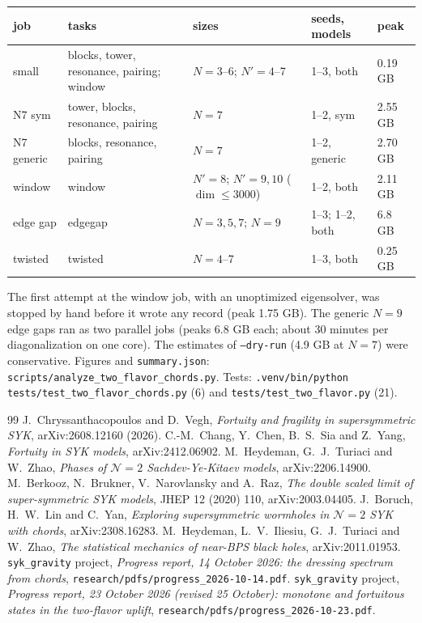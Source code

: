 \documentclass[11pt]{article}
\newcommand{\Np}{N'}
\theoremstyle{plain}
\theoremstyle{remark}
\numberwithin{equation}{section}
\begin{document}
\begin{center}\footnotesize
\begin{tabular}{lp{4.6cm}lll}
\toprule
job & tasks & sizes & seeds, models & peak\\
\midrule
small & blocks, tower, resonance, pairing; window & $N=3$--6; $\Np=4$--7 & 1--3, both & 0.19 GB\\
N7 sym & tower, blocks, resonance, pairing & $N=7$ & 1--2, sym & 2.55 GB\\
N7 generic & blocks, resonance, pairing & $N=7$ & 1--2, generic & 2.70 GB\\
window & window & $\Np=8$; $\Np=9,10$ ($\dim\le3000$) & 1--2, both & 2.11 GB\\
edge gap & edgegap & $N=3,5,7$; $N=9$ & 1--3; 1--2, both & 6.8 GB\\
twisted & twisted & $N=4$--7 & 1--3, both & 0.25 GB\\
\bottomrule
\end{tabular}
\end{center}
The first attempt at the window job, with an unoptimized eigensolver, was stopped by hand before it wrote any
record (peak 1.75 GB). The generic $N=9$ edge gaps ran as two parallel jobs (peaks 6.8 GB each; about 30 minutes per
diagonalization on one core). The estimates of \texttt{--dry-run} (4.9 GB at $N=7$) were conservative. Figures and
\texttt{summary.json}: \texttt{scripts/analyze\_two\_flavor\_chords.py}. Tests:
\texttt{.venv/bin/python tests/test\_two\_flavor\_chords.py} (6) and \texttt{tests/test\_two\_flavor.py} (21).

\begin{thebibliography}{99}\small
{} J.~Chryssanthacopoulos and D.~Vegh, \emph{Fortuity and fragility in supersymmetric SYK}, arXiv:2608.12160 (2026).
 C.-M.~Chang, Y.~Chen, B.~S.~Sia and Z.~Yang, \emph{Fortuity in SYK models}, arXiv:2412.06902.
 M.~Heydeman, G.~J.~Turiaci and W.~Zhao, \emph{Phases of $\mathcal N=2$ Sachdev-Ye-Kitaev models}, arXiv:2206.14900.
 M.~Berkooz, N.~Brukner, V.~Narovlansky and A.~Raz, \emph{The double scaled limit of super-symmetric SYK models}, JHEP 12 (2020) 110, arXiv:2003.04405.
 J.~Boruch, H.~W.~Lin and C.~Yan, \emph{Exploring supersymmetric wormholes in $\mathcal N=2$ SYK with chords}, arXiv:2308.16283.
 M.~Heydeman, L.~V.~Iliesiu, G.~J.~Turiaci and W.~Zhao, \emph{The statistical mechanics of near-BPS black holes}, arXiv:2011.01953.
 \texttt{syk\_gravity} project, \emph{Progress report, 14 October 2026: the dressing spectrum from chords}, \texttt{research/pdfs/progress\_2026-10-14.pdf}.
 \texttt{syk\_gravity} project, \emph{Progress report, 23 October 2026 (revised 25 October): monotone and fortuitous states in the two-flavor uplift}, \texttt{research/pdfs/progress\_2026-10-23.pdf}.
\end{thebibliography}
\end{document}
